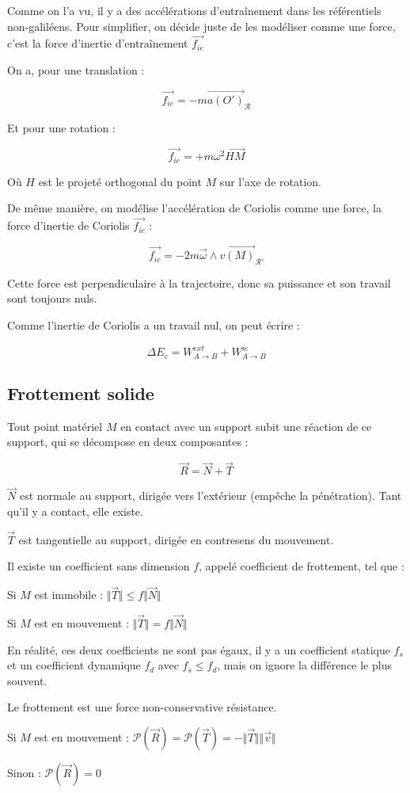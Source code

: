 \documentclass[a4paper,12pt]{book}
\newcommand{\Def}[2]{\begin{tcolorbox}[colback=white,colframe=red!10!green!20!blue!75!, title=Définition : #1]#2\end{tcolorbox}}
\newcommand{\Thr}[2]{\begin{tcolorbox}[sharp corners, colback=white,colframe=red!10!blue!30!green!75!, title=Théorème : #1]#2\end{tcolorbox}}
\renewcommand{\Vec}[1]{\overrightarrow{#1}}
\begin{document}
\Thr{Forces d'inertie}{Comme on l'a vu, il y a des accélérations d'entraînement dans les référentiels non-galiléens. Pour simplifier, on décide juste de les modéliser comme une force, c'est la force d'inertie d'entraînement $\Vec{f_{ie}}$
\par On a, pour une translation :
\par $$\Vec{f_{ie}} = -m\Vec{a(O')}_\mathcal{R}$$
\par Et pour une rotation :
\par $$\Vec{f_{ie}} = +m\omega^2\Vec{HM}$$
\par Où $H$ est le projeté orthogonal du point $M$ sur l'axe de rotation.}
\Thr{Force de Coriolis}{De même manière, on modélise l'accélération de Coriolis comme une force, la force d'inertie de Coriolis $\Vec{f_{ic}}$ :
\par $$\Vec{f_{ic}} = -2m\Vec{\omega}\wedge\Vec{v(M)}_{\mathcal{R}'}$$
\par Cette force est perpendiculaire à la trajectoire, donc sa puissance et son travail sont toujours nuls.}
\Thr{TEC non-galiléen}{Comme l'inertie de Coriolis a un travail nul, on peut écrire :
\par $$\Delta E_c = W^{ext}_{A\to B} + W^{ie}_{A\to B}$$}

\subsection{Frottement solide}
\Def{Force de réaction}{Tout point matériel $M$ en contact avec un support subit une réaction de ce support, qui se décompose en deux composantes :
\par $$\Vec{R} = \Vec{N}+\Vec{T}$$
\par $\Vec{N}$ est normale au support, dirigée vers l'extérieur (empêche la pénétration). Tant qu'il y a contact, elle existe.
\par $\Vec{T}$ est tangentielle au support, dirigée en contresens du mouvement.}
\Thr{Coefficient de frottement}{Il existe un coefficient sans dimension $f$, appelé coefficient de frottement, tel que :
\par Si $M$ est immobile : $\Vert\Vec{T}\Vert\leq f\Vert\Vec{N}\Vert$
\par Si $M$ est en mouvement : $\Vert\Vec{T}\Vert=f\Vert\Vec{N}\Vert$
\par En réalité, ces deux coefficients ne sont pas égaux, il y a un coefficient statique $f_s$ et un coefficient dynamique $f_d$ avec $f_s\leq f_d$, mais on ignore la différence le plus souvent.}
\Thr{Aspects énergétiques du frottement}{Le frottement est une force non-conservative résistance.
\par Si $M$ est en mouvement : $\mathcal{P}(\Vec{R}) = \mathcal{P}(\Vec{T}) = -\Vert\Vec{T}\Vert\Vert\Vec{v}\Vert$
\par Sinon : $\mathcal{P}(\Vec{R}) = 0$}
\end{document}
